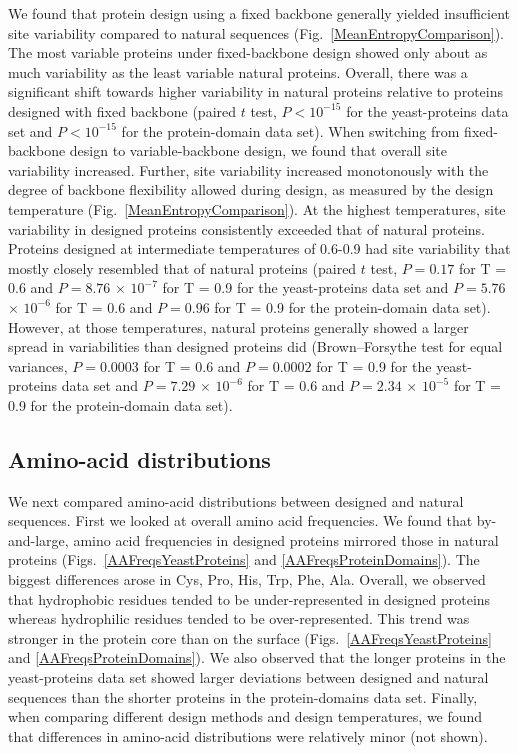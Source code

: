 \documentclass[12pt]{article}
\begin{document}
We found that protein design using a fixed backbone generally yielded insufficient site variability compared to natural sequences (Fig.~\ref{MeanEntropyComparison}). The most variable proteins under fixed-backbone design showed only about as much variability as the least variable natural proteins. Overall, there was a significant shift towards higher variability in natural proteins relative to proteins designed with fixed backbone (paired $t$ test, $P<10^{-15}$ for the yeast-proteins data set and $P<10^{-15}$ for the protein-domain data set). When switching from fixed-backbone design to variable-backbone design, we found that overall site variability increased. Further, site variability increased monotonously with the degree of backbone flexibility allowed during design, as measured by the design temperature (Fig.~\ref{MeanEntropyComparison}). At the highest temperatures, site variability in designed proteins consistently exceeded that of natural proteins. Proteins designed at intermediate temperatures of 0.6-0.9 had site variability that mostly closely resembled that of natural proteins (paired $t$ test, $P= 0.17$ for T = 0.6 and $P= 8.76$ $\times$  $10^{-7}$  for T  = 0.9 for the yeast-proteins data set and $P= 5.76$ $\times$  $10^{-6}$ for T = 0.6 and $P = 0.96 $ for T = 0.9 for the protein-domain data set). However, at those temperatures, natural proteins generally showed a larger spread in variabilities than designed proteins did (Brown–Forsythe test for equal variances,  $P= 0.0003$ for T = 0.6 and $P=0.0002$ for T = 0.9 for the yeast-proteins data set and $P= 7.29$  $\times$  $10^{-6}$ for T = 0.6 and  $P= 2.34$ $\times $ $10^{-5}$ for T = 0.9  for the protein-domain data set).

\subsection{Amino-acid distributions}
\label{AminoAcidDistributions}

We next compared amino-acid distributions between designed and natural sequences. First we looked at overall amino acid frequencies. We found that by-and-large, amino acid frequencies in designed proteins mirrored those in natural proteins (Figs.~\ref{AAFreqsYeastProteins} and \ref{AAFreqsProteinDomains}). The biggest differences arose in Cys, Pro, His, Trp, Phe, Ala. Overall, we observed that hydrophobic residues tended to be under-represented in designed proteins whereas hydrophilic residues tended to be over-represented. This trend was stronger in the protein core than on the surface (Figs.~\ref{AAFreqsYeastProteins} and \ref{AAFreqsProteinDomains}). We also observed that the longer proteins in the yeast-proteins data set showed larger deviations between designed and natural sequences than the shorter proteins in the protein-domains data set. Finally, when comparing different design methods and design temperatures, we found that differences in amino-acid distributions were relatively minor (not shown).
\end{document}
